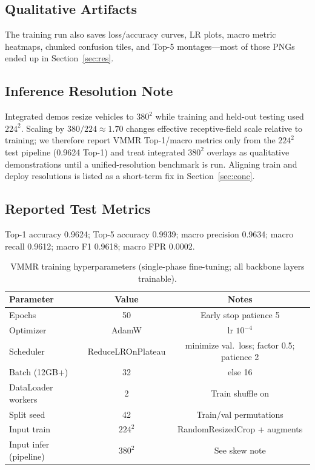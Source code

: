 \documentclass[10pt, conference]{IEEEtran}
\begin{document}
\subsection{Qualitative Artifacts}
The training run also saves loss/accuracy curves, LR plots, macro metric heatmaps, chunked confusion tiles, and Top-5 montages---most of those PNGs ended up in Section~\ref{sec:res}.

\subsection{Inference Resolution Note}
Integrated demos resize vehicles to $380^2$ while training and held-out testing used $224^2$. Scaling by $380/224\approx 1.70$ changes effective receptive-field scale relative to training; we therefore report VMMR Top-1/macro metrics only from the $224^2$ test pipeline (0.9624 Top-1) and treat integrated $380^2$ overlays as qualitative demonstrations until a unified-resolution benchmark is run. Aligning train and deploy resolutions is listed as a short-term fix in Section~\ref{sec:conc}.

\subsection{Reported Test Metrics}
Top-1 accuracy 0.9624; Top-5 accuracy 0.9939; macro precision 0.9634; macro recall 0.9612; macro F1 0.9618; macro FPR 0.0002.

\begin{table}[!htbp]
\centering
\caption{VMMR training hyperparameters (single-phase fine-tuning; all backbone layers trainable).}
\label{tab:vmmrtrain}
\footnotesize
\begin{tabular}{@{}lcc@{}}
\toprule
Parameter & Value & Notes \\
\midrule
Epochs & 50 & Early stop patience 5 \\
Optimizer & AdamW & lr $10^{-4}$ \\
Scheduler & ReduceLROnPlateau & minimize val.\ loss; factor 0.5; patience 2 \\
Batch (12GB+) & 32 & else 16 \\
DataLoader workers & 2 & Train shuffle on \\
Split seed & 42 & Train/val permutations \\
Input train & $224^2$ & RandomResizedCrop + augments \\
Input infer (pipeline) & $380^2$ & See skew note \\
\bottomrule
\end{tabular}
\end{table}
\end{document}
